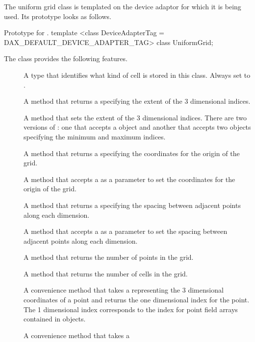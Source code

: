 The uniform grid class is templated on the device adaptor for which it is
being used. Its prototype looks as follows.

\begin{daxexample}{Prototype for \protect{}.}
template <class DeviceAdapterTag = DAX_DEFAULT_DEVICE_ADAPTER_TAG>
class UniformGrid;
\end{daxexample}

The  class provides the following features.
\begin{description}
\item[] A type that identifies what kind of cell is
  stored in this class. Always set to .
\item[] A method that returns a 
  specifying the extent of the 3 dimensional indices.
\item[] A method that sets the extent of the 3
  dimensional indices. There are two versions of : one
  that accepts a  object and another that accepts two
   objects specifying the minimum and maximum indices.
\item[] A method that returns a 
  specifying the coordinates for the origin of the grid.
\item[] A method that accepts a  as a
  parameter to set the coordinates for the origin of the grid.
\item[] A method that returns a 
  specifying the spacing between adjacent points along each dimension.
\item[] A method that accepts a  as a
  parameter to set the spacing between adjacent points along each
  dimension.
\item[] A method that returns the number of
  points in the grid.
\item[] A method that returns the number of
  cells in the grid.
\item[] A convenience method that takes a
   representing the 3 dimensional coordinates of a point and
  returns the one dimensional index for the point. The 1 dimensional index
  corresponds to the index for point field arrays contained in
   objects.
\item[] A convenience method that takes a

\end{description}
